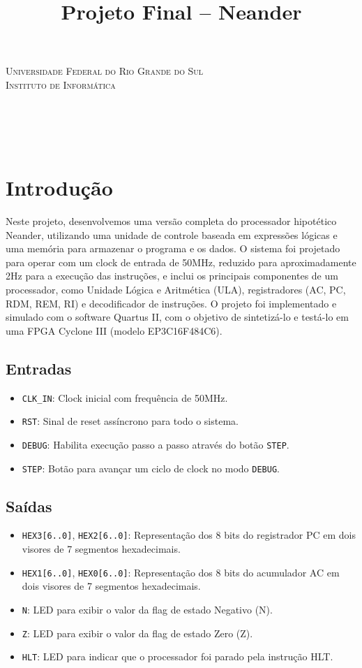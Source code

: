 \documentclass[12pt, fleqn]{article}
\title{Projeto Final – Neander}
\renewcommand{\maketitle}{
    \begin{titlepage}
        \begin{center}
            {\scshape Universidade Federal do Rio Grande do Sul\\Instituto de Informática} \\
            \vspace*{\fill}
            {\large \thecourse} \\[16pt]
            {\Huge \thetitle} \\[36pt]
            \theauthors \\
            \vspace*{\fill}
            \theprofessor \\[2pt]
            \thesemester
        \end{center}
    \end{titlepage}
}
\begin{document}
\maketitle

\section{Introdução}

Neste projeto, desenvolvemos uma versão completa do processador hipotético Neander, utilizando uma unidade de controle baseada em expressões lógicas e uma memória para armazenar o programa e os dados. O sistema foi projetado para operar com um clock de entrada de 50MHz, reduzido para aproximadamente 2Hz para a execução das instruções, e inclui os principais componentes de um processador, como Unidade Lógica e Aritmética (ULA), registradores (AC, PC, RDM, REM, RI) e decodificador de instruções. O projeto foi implementado e simulado com o software Quartus II, com o objetivo de sintetizá-lo e testá-lo em uma FPGA Cyclone III (modelo EP3C16F484C6).

\subsection{Entradas}

\begin{itemize}
    \item \texttt{CLK\_IN}: Clock inicial com frequência de 50MHz.
    \item \texttt{RST}: Sinal de reset assíncrono para todo o sistema.
    \item \texttt{DEBUG}: Habilita execução passo a passo através do botão \texttt{STEP}.
    \item \texttt{STEP}: Botão para avançar um ciclo de clock no modo \texttt{DEBUG}.
\end{itemize}

\subsection{Saídas}

\begin{itemize}
    \item \texttt{HEX3[6..0]}, \texttt{HEX2[6..0]}: Representação dos 8 bits do registrador PC em dois visores de 7 segmentos hexadecimais.
    \item \texttt{HEX1[6..0]}, \texttt{HEX0[6..0]}: Representação dos 8 bits do acumulador AC em dois visores de 7 segmentos hexadecimais.
    \item \texttt{N}: LED para exibir o valor da flag de estado Negativo (N).
    \item \texttt{Z}: LED para exibir o valor da flag de estado Zero (Z).
    \item \texttt{HLT}: LED para indicar que o processador foi parado pela instrução HLT.
\end{itemize}
\end{document}
